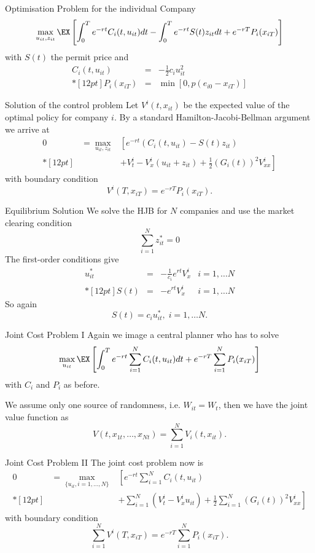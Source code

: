 Optimisation Problem for the individual Company
		\begin{equation}
		\max_{u_{it}, z_{it}} \EX\left[\int_0^Te^{-rt}C_i(t,u_{it})dt - \int_0^T e^{-rt}S(t)z_{it}dt+ e^{-rT}P_i(x_{iT})\right]
		\end{equation}
	with $S(t)$ the permit price and
		$$
		\begin{array}{lll}
		C_i(t,u_{it}) &=& - \frac{1}{2}c_i u_{it}^2 \\*[12pt]
		P_i(x_{iT}) &=& \min[0,p(e_{i0}-x_{iT})]
		\end{array}
		$$


Solution of the control problem
	Let $V^i(t,x_{it})$ be the expected value of the optimal policy for company $i$. By a standard
	Hamilton-Jacobi-Bellman argument we arrive at
		$$
		\begin{array}{lll}
		0&=\max_{u_{it},z_{it}}&\left[e^{-rt}(C_i(t,u_{it}) - S(t) z_{it})\right.\\*[12pt]
		&&+\left.V^i_t -V_x^i(u_{it}+z_{it}) + \frac{1}{2}(G_i(t))^2 V^i_{xx}\right]
		\end{array}
		$$
	with boundary condition
		$$	
		V^i(T, x_{iT})=e^{-rT}P_i(x_{iT}).
		$$


Equilibrium Solution
	We solve the HJB for $N$ companies and use the market clearing condition
		$$
		\sum_{i=1}^N z_{it}^*=0
		$$
	The first-order conditions give
		$$
		\begin{array}{llll}
		u_{it}^* &=& -\frac{1}{c_i} e^{rt} V^i_x & i=1, \ldots N \\*[12pt]
		S(t) &=& - e^{rt} V^i_{x} & i=1, \ldots N
		\end{array}
		$$
	So again
		$$
		S(t) = c_i u_{it}^*, \; i=1, \ldots N.
		$$


Joint Cost Problem I
	Again we image a central planner who has to solve
		\begin{equation}
		\max_{u_{it}} \EX\left[\int_0^Te^{-rt}\sum_{i=1}^N C_i(t,u_{it})dt + e^{-rT} \sum_{i=1}^N P_i(x_{iT})\right]
		\end{equation}
	with $C_i$ and $P_i$ as before.

	We assume only one source of randomness, i.e. $W_{it}= W_t$, then we have the  joint value function as
		$$
		V(t, x_{1t}, \ldots, x_{Nt}) = \sum_{i=1}^N V_i(t,x_{it}).
		$$



Joint Cost Problem II
	The joint cost problem now is
		$$
		\begin{array}{lll}
		0&=\displaystyle \max_{\{u_{it},i=1, \ldots, N\}}&\displaystyle \left[e^{-rt}\sum_{i=1}^N C_i(t,u_{it})\right.\\*[12pt]
		&&+\displaystyle \left.\sum_{i=1}^N (V^i_t -V_x^iu_{it}) + \frac{1}{2}\sum_{i=1}^N(G_i(t))^2 V^i_{xx}\right]
		\end{array}
		$$
	with boundary condition
		$$
		\sum_{i=1}^N V^i(T, x_{iT})=e^{-rT}\sum_{i=1}^N P_i(x_{iT}).
		$$
	

